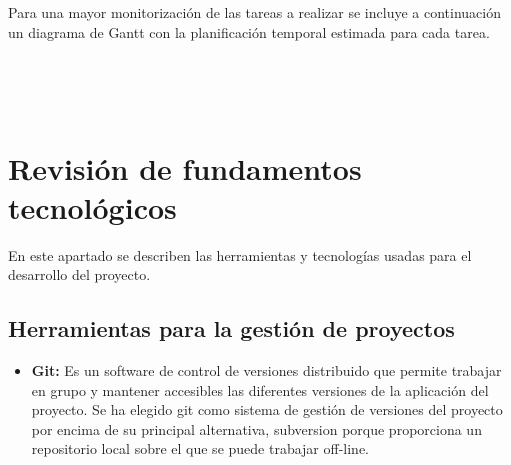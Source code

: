 \documentclass[12pt, a4paper]{article}
\def\GanttHeader#1#2#3#4{%
	\pgfmathparse{(#1-#2-#3)/#4}
	\tikzset{y=7mm, task number/.style={left, font=\bfseries},
		task description/.style={text width=#3,  right, draw=none,
			font=\sffamily, xshift=#2,
			minimum height=2em},
		gantt bar/.style={draw=black, fill=blue!30},
		help lines/.style={draw=black!30, dashed},
		x=\pgfmathresult pt
	}
	\def\totalmonths{#4}
	\node (Header) [task description] at (0,0) {\textbf{\large Tareas}};
	\begin{scope}[shift=($(Header.south east)$)]
		\foreach \x in {1,...,#4}
		\node[above] at (\x,0) {\footnotesize\x};
	\end{scope}
}
\def\Task#1#2#3#4{%
	\node[task number] at ($(Header.west) + (0, -#1)$) {#1};
	\node[task description] at (0,-#1) {#2};
	\begin{scope}[shift=($(Header.south east)$)]
		\draw (0,-#1) rectangle +(\totalmonths, 1);
		\foreach \x in {1,...,\totalmonths}
		\draw[help lines] (\x,-#1) -- +(0,1);
		\filldraw[gantt bar] ($(#3, -#1+0.2)$) rectangle +(#4,0.6);
	\end{scope}
}
\begin{document}
Para una mayor monitorización de las tareas a realizar se incluye a continuación un diagrama de Gantt con la planificación temporal estimada para cada tarea.

\newpage
\begin{landscape}
	
\\

\\



\end{landscape} 

\newpage

\section{Revisión de fundamentos tecnológicos}

En este apartado se describen las herramientas y tecnologías usadas para el desarrollo del proyecto.

\subsection{Herramientas para la gestión de proyectos}
\begin{itemize}
	\item \textbf{Git: } Es un software de control de versiones distribuido que permite trabajar en grupo y mantener accesibles las diferentes versiones de la aplicación del proyecto. Se ha elegido git como sistema de gestión de versiones del proyecto por encima de su principal alternativa, subversion porque proporciona un repositorio local sobre el que se puede trabajar off-line.
\end{itemize}
\end{document}
